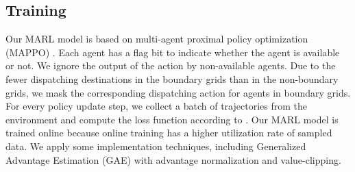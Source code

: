 \subsection{Training}
 
		
Our MARL model is based on multi-agent proximal policy optimization (MAPPO) \cite{neurips22}. 
Each agent has a flag bit to indicate whether the agent is available or not. We ignore the output of the action by non-available agents. Due to the fewer dispatching destinations in the boundary grids than in the non-boundary grids, we mask the corresponding dispatching action for agents in boundary grids. For every policy update step, we collect a batch of trajectories from the environment and compute the loss function according to \cite{PPO}. Our MARL model is trained online because online training has a higher utilization rate of sampled data. 
We apply some implementation techniques, including Generalized Advantage Estimation (GAE) with advantage normalization and value-clipping. 


